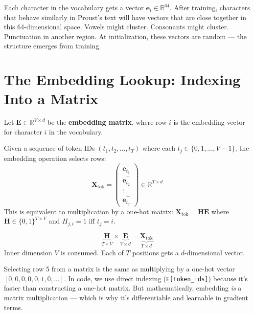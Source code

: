 \documentclass[11pt, a4paper]{article}
\newcommand{\R}{\mathbb{R}}
\newcommand{\ve}{\bm{e}}
\newcommand{\mX}{\bm{X}}
\newcommand{\mE}{\bm{E}}
\begin{document}
\begin{transformer}
Each character in the vocabulary gets a vector $\ve_i \in \R^{64}$.
After training, characters that behave similarly in Proust's text will have
vectors that are close together in this 64-dimensional space.
Vowels might cluster. Consonants might cluster. Punctuation in another region.
At initialization, these vectors are random --- the structure emerges from training.
\end{transformer}

\section{The Embedding Lookup: Indexing Into a Matrix}

\begin{formaldef}
Let $\mE \in \R^{V \times d}$ be the \textbf{embedding matrix}, where row $i$ is the
embedding vector for character $i$ in the vocabulary.

Given a sequence of token IDs $(t_1, t_2, \ldots, t_T)$ where each $t_j \in \{0, 1, \ldots, V-1\}$,
the embedding operation selects rows:
\[
\mX_{\text{tok}} = \begin{pmatrix} \ve_{t_1}^\top \\ \ve_{t_2}^\top \\ \vdots \\ \ve_{t_T}^\top \end{pmatrix}
\in \R^{T \times d}
\]
This is equivalent to multiplication by a one-hot matrix:
$\mX_{\text{tok}} = \bm{H} \mE$ where $\bm{H} \in \{0,1\}^{T \times V}$
and $H_{j,i} = 1$ iff $t_j = i$.
\end{formaldef}

\begin{dimcheck}
\[
\underbrace{\bm{H}}_{T \times V} \times \underbrace{\mE}_{V \times d} = \underbrace{\mX_{\text{tok}}}_{T \times d}
\]
Inner dimension $V$ is consumed. Each of $T$ positions gets a $d$-dimensional vector.
\end{dimcheck}

\begin{intuition}
Selecting row 5 from a matrix is the same as multiplying by a one-hot vector
$[0,0,0,0,0,1,0,\ldots]$. In code, we use direct indexing (\texttt{E[token\_ids]})
because it's faster than constructing a one-hot matrix. But mathematically, embedding
\textit{is} a matrix multiplication --- which is why it's differentiable and learnable in gradient terms.
\end{intuition}
\end{document}
